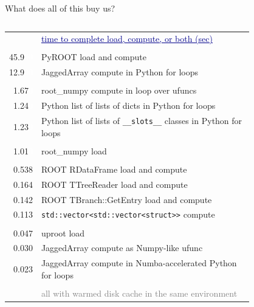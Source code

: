 \documentclass[aspectratio=169]{beamer}
\begin{document}
\begin{frame}{What does all of this buy us?}
\begin{columns}
\begin{columns}
\begin{tabular}{r p{0.9\linewidth}}
& \textcolor{darkblue}{\small\underline{time to complete load, compute, or both (sec)}} \\
& \\
45.9\textcolor{white}{00} & \textcolor{rootcolor}{PyROOT load and compute} \\
12.9\textcolor{white}{00} & \textcolor{mycolor}{JaggedArray compute in Python for loops} \\
& \\
1.67\textcolor{white}{0} & \textcolor{rootnpcolor}{root\_numpy compute in loop over ufuncs} \\
 1.24\textcolor{white}{0} & \textcolor{pythoncolor}{Python list of lists of dicts in Python for loops} \\
 1.23\textcolor{white}{0} & \textcolor{pythoncolor}{Python list of lists of {\tt\scriptsize \_\_slots\_\_} classes in Python for loops} \\
& \\
 1.01\textcolor{white}{0} & \textcolor{rootnpcolor}{root\_numpy load} \\
& \\
 0.538 & \textcolor{rootcolor}{ROOT RDataFrame load and compute} \\
 0.164 & \textcolor{rootcolor}{ROOT TTreeReader load and compute} \\
 0.142 & \textcolor{rootcolor}{ROOT TBranch::GetEntry load and compute} \\
 0.113 & \textcolor{cppcolor}{{\tt\scriptsize std::vector<std::vector<struct>>} compute} \\
& \\
 0.047 & \textcolor{mycolor}{uproot load} \\
 0.030 & \textcolor{mycolor}{JaggedArray compute as Numpy-like ufunc} \\
 0.023 & \textcolor{mycolor}{JaggedArray compute in Numba-accelerated Python for loops} \\
& \\
& \textcolor{gray}{\scriptsize all with warmed disk cache in the same environment} \\
\end{tabular}
\end{columns}
\end{columns}
\end{frame}
\end{document}
